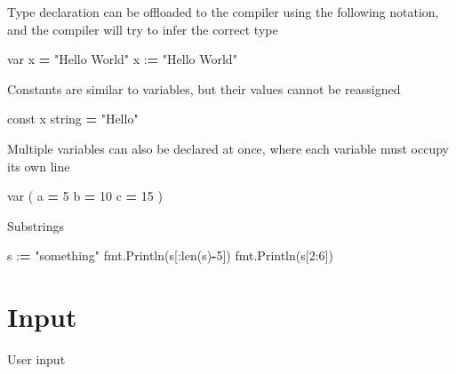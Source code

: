 \documentclass[]{book}
\newenvironment{Shaded}{\begin{snugshade}}{\end{snugshade}}
\newcommand{\BuiltInTok}[1]{#1}
\newcommand{\DecValTok}[1]{\textcolor[rgb]{0.00,0.00,0.81}{#1}}
\newcommand{\NormalTok}[1]{#1}
\newcommand{\OperatorTok}[1]{\textcolor[rgb]{0.81,0.36,0.00}{\textbf{#1}}}
\newcommand{\SpecialCharTok}[1]{\textcolor[rgb]{0.00,0.00,0.00}{#1}}
\newcommand{\StringTok}[1]{\textcolor[rgb]{0.31,0.60,0.02}{#1}}
\begin{document}
Type declaration can be offloaded to the compiler using the following notation, and the compiler will try to infer the correct type

\begin{Shaded}
\begin{Highlighting}[]
\NormalTok{var x }\OperatorTok{=} \StringTok{"Hello World"}
\NormalTok{x :}\OperatorTok{=} \StringTok{"Hello World"}
\end{Highlighting}
\end{Shaded}

Constants are similar to variables, but their values cannot be reassigned

\begin{Shaded}
\begin{Highlighting}[]
\NormalTok{const x string }\OperatorTok{=} \StringTok{"Hello"}
\end{Highlighting}
\end{Shaded}

Multiple variables can also be declared at once, where each variable must occupy its own line

\begin{Shaded}
\begin{Highlighting}[]
\NormalTok{var (}
\NormalTok{    a }\OperatorTok{=} \DecValTok{5}
\NormalTok{    b }\OperatorTok{=} \DecValTok{10}
\NormalTok{    c }\OperatorTok{=} \DecValTok{15}
\NormalTok{)}
\end{Highlighting}
\end{Shaded}

Substrings

\begin{Shaded}
\begin{Highlighting}[]
\NormalTok{s :}\OperatorTok{=} \StringTok{"something"}
\NormalTok{fmt.Println(s[:}\BuiltInTok{len}\NormalTok{(s)}\OperatorTok{-}\DecValTok{5}\NormalTok{])}
\NormalTok{fmt.Println(s[}\DecValTok{2}\NormalTok{:}\DecValTok{6}\NormalTok{])}
\end{Highlighting}
\end{Shaded}

\hypertarget{input}{%
\section{Input}\label{input}}

User input

\begin{Shaded}
\end{Shaded}
\end{document}
